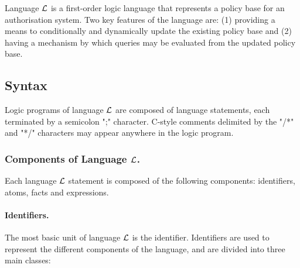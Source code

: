 \documentclass[global,twocolumn,final]{svjour}
\begin{document}
    Language $\cal{L}$ is a first-order logic language that represents a policy
    base for an authorisation system. Two key features of the language are: (1)
    providing a means to conditionally and dynamically update the existing
    policy base and (2) having a mechanism by which queries may be evaluated
    from the updated policy base.

    \subsection{Syntax}
      \label{subsec-syntax}

      Logic programs of language ${\cal L}$ are composed of language
      statements, each terminated by a semicolon ";" character. C-style
      comments delimited by the "/*" and "*/" characters may appear anywhere in
      the logic program.

      \subsubsection{Components of Language $\cal{L}$.}

        Each language ${\cal L}$ statement is composed of the following
        components: identifiers, atoms, facts and expressions.

        \paragraph{Identifiers.}
          The most basic unit of language $\cal{L}$ is the identifier.
          Identifiers are used to represent the different components of the
          language, and are divided into three main classes:
\end{document}
